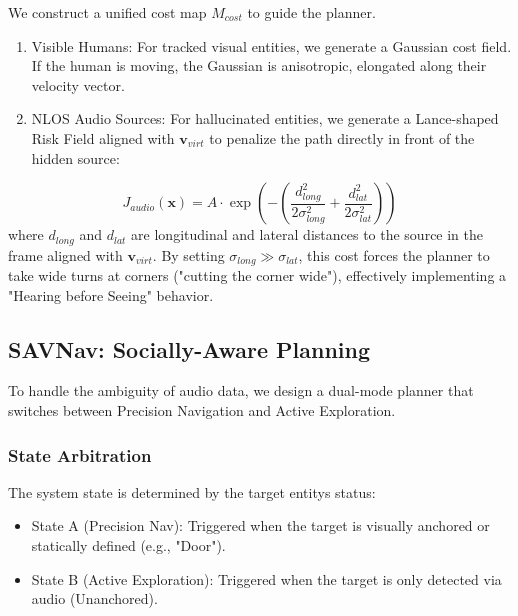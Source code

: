 We construct a unified cost map \(M_{cost}\) to guide the planner.

\begin{enumerate}
    \def\labelenumi{\arabic{enumi}.}
    \item
          Visible Humans: For tracked visual entities, we generate a Gaussian
          cost field. If the human is moving, the Gaussian is anisotropic,
          elongated along their velocity vector.
    \item
          NLOS Audio Sources: For hallucinated entities, we generate a
          Lance-shaped Risk Field aligned with \(\mathbf{v}_{virt}\) to penalize
          the path directly in front of the hidden source:
\end{enumerate}

\begin{equation}
    J_{audio}(\mathbf{x}) = A \cdot \exp \left( - \left( \frac{d_{long}^2}{2\sigma_{long}^2} + \frac{d_{lat}^2}{2\sigma_{lat}^2} \right) \right)
\end{equation}
where \(d_{long}\) and \(d_{lat}\) are longitudinal and lateral
distances to the source in the frame aligned with \(\mathbf{v}_{virt}\).
By setting \(\sigma_{long} \gg \sigma_{lat}\), this cost forces the
planner to take wide turns at corners ("cutting the corner wide"),
effectively implementing a "Hearing before Seeing" behavior.

\subsection{SAVNav: Socially-Aware
    Planning}\label{savnav-socially-aware-planning}

To handle the ambiguity of audio data, we design a dual-mode planner
that switches between Precision Navigation and Active Exploration.

\subsubsection{State Arbitration}\label{state-arbitration}

The system state is determined by the target entity\textquotesingle s
status:

\begin{itemize}
    \item
          State A (Precision Nav): Triggered when the target is visually
          anchored or statically defined (e.g., "Door").
    \item
          State B (Active Exploration): Triggered when the target is only
          detected via audio (Unanchored).
\end{itemize}

